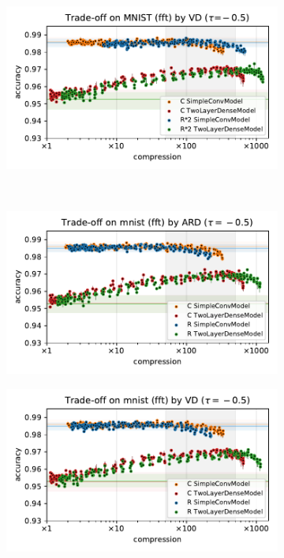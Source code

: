 \documentclass[a4paper,10pt,onecolumn]{article}
\begin{document}
\begin{figure}[b]
\begin{subfigure}[b]{0.5\columnwidth}
  \end{subfigure}%
  \begin{subfigure}[b]{0.5\columnwidth}
    \centering
    \includegraphics[width=\columnwidth]{figure__mnist-like__trade-off/appendix__cmp__VD__mnist__fft__-0.5.pdf}
  \end{subfigure} \\ %
  \begin{subfigure}[b]{0.5\columnwidth}
    \centering
    \includegraphics[width=\columnwidth]{figure__mnist-like__trade-off/appendix__ARD__mnist__fft__-0.5.pdf}
  \end{subfigure}%
  \begin{subfigure}[b]{0.5\columnwidth}
    \centering
    \includegraphics[width=\columnwidth]{figure__mnist-like__trade-off/appendix__VD__mnist__fft__-0.5.pdf}

\end{subfigure}
\end{figure}
\end{document}
